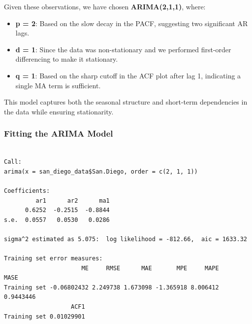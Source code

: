 \documentclass[
  11pt,
]{article}
\newenvironment{Shaded}{\begin{snugshade}}{\end{snugshade}}
\newcommand{\AttributeTok}[1]{\textcolor[rgb]{0.40,0.45,0.13}{#1}}
\newcommand{\CommentTok}[1]{\textcolor[rgb]{0.37,0.37,0.37}{#1}}
\newcommand{\DecValTok}[1]{\textcolor[rgb]{0.68,0.00,0.00}{#1}}
\newcommand{\FunctionTok}[1]{\textcolor[rgb]{0.28,0.35,0.67}{#1}}
\newcommand{\NormalTok}[1]{\textcolor[rgb]{0.00,0.23,0.31}{#1}}
\newcommand{\OtherTok}[1]{\textcolor[rgb]{0.00,0.23,0.31}{#1}}
\newcommand{\SpecialCharTok}[1]{\textcolor[rgb]{0.37,0.37,0.37}{#1}}
\begin{document}
Given these observations, we have chosen \textbf{ARIMA(2,1,1)}, where:

\begin{itemize}
\item
  \textbf{p = 2}: Based on the slow decay in the PACF, suggesting two
  significant AR lags.
\item
  \textbf{d = 1}: Since the data was non-stationary and we performed
  first-order differencing to make it stationary.
\item
  \textbf{q = 1}: Based on the sharp cutoff in the ACF plot after lag 1,
  indicating a single MA term is sufficient.
\end{itemize}

This model captures both the seasonal structure and short-term
dependencies in the data while ensuring stationarity.

\subsubsection{Fitting the ARIMA Model}\label{fitting-the-arima-model}

\begin{Shaded}
\end{Shaded}

\begin{verbatim}

Call:
arima(x = san_diego_data$San.Diego, order = c(2, 1, 1))

Coefficients:
         ar1      ar2      ma1
      0.6252  -0.2515  -0.8844
s.e.  0.0557   0.0530   0.0286

sigma^2 estimated as 5.075:  log likelihood = -812.66,  aic = 1633.32

Training set error measures:
                      ME     RMSE      MAE       MPE     MAPE      MASE
Training set -0.06802432 2.249738 1.673098 -1.365918 8.006412 0.9443446
                   ACF1
Training set 0.01029901
\end{verbatim}

\begin{Shaded}
\end{Shaded}
\end{document}
